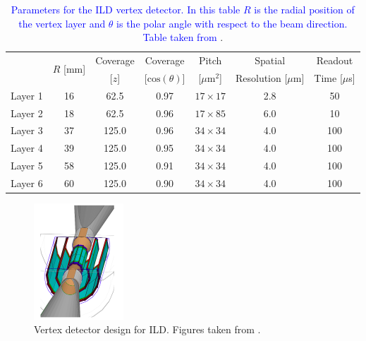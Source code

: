 \begin{table}[h!]
\centering
\begin{tabular}{ l c c c c c c}
\hline
& \multirow{2}{*}{$R$ [mm]} & Coverage & Coverage & Pitch & Spatial & Readout \\
& & [$z$] & [$\text{cos}(\theta)$] & [$\mu\text{m}^{2}$] & Resolution [$\mu$m] & Time [$\mu$s] \\
\hline
Layer 1 & 16 & 62.5 & 0.97 & $17 \times 17$ & 2.8 & 50 \\
Layer 2 & 18 & 62.5 & 0.96 & $17 \times 85$ & 6.0 & 10 \\
\hline
Layer 3 & 37 & 125.0 & 0.96 & $34 \times 34$ & 4.0 & 100 \\
Layer 4 & 39 & 125.0 & 0.95 & $34 \times 34$ & 4.0 & 100 \\
\hline
Layer 5 & 58 & 125.0 & 0.91 & $34 \times 34$ & 4.0 & 100 \\
Layer 6 & 60 & 125.0 & 0.90 & $34 \times 34$ & 4.0 & 100 \\
\hline
\end{tabular}
\caption[Parameters for the ILD vertex detector.  In this table $R$ is the radial position of the vertex layer and $\theta$ is the polar angle with respect to the beam direction.  Table taken from \cite{Behnke:2013lya}.]{\textcolor{blue}{Parameters for the ILD vertex detector.  In this table $R$ is the radial position of the vertex layer and $\theta$ is the polar angle with respect to the beam direction.  Table taken from \cite{Behnke:2013lya}}.}
\label{table:vertexdetectorparam}
\end{table}

\begin{figure}[h!]
\centering
\includegraphics[width=0.3\textwidth]{LCDetectorsAndPFlow/Plots/Pictures/Vertex3.png}
\caption[Vertex detector design for ILD.  Figures taken from \cite{arXiv:1006.3396}.]{Vertex detector design for ILD.  Figures taken from \cite{arXiv:1006.3396}.}
\label{fig:vertexpicture}
\end{figure} 


